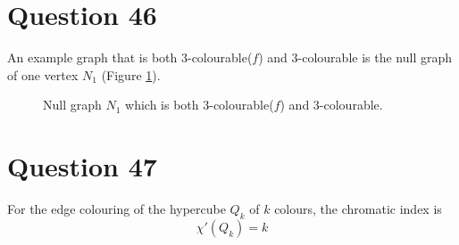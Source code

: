 \documentclass[11pt, oneside]{article}   	%
\begin{document}
\section*{Question 46}

An example graph that is both 3-colourable($f$) and 3-colourable is the null graph of one vertex $N_1$ (Figure \ref{N1}).

\begin{figure}[h]           
            \centering
            \caption{Null graph $N_1$ which is both 3-colourable($f$) and 3-colourable.}
            \label{N1}
\end{figure}




\section*{Question 47}

For the edge colouring of the hypercube $Q_k$ of $k$ colours, the chromatic index is
$$\chi'(Q_k)= k$$
\end{document}
